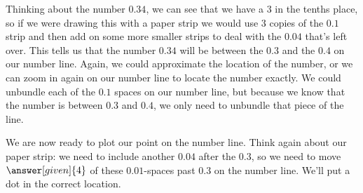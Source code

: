 \documentclass{ximera}
\begin{document}
\begin{example}
Thinking about the number $0.34$, we can see that we have a $3$ in the tenths place, so if we were drawing this with a paper strip we would use $3$ copies of the $0.1$ strip and then add on some more smaller strips to deal with the $0.04$ that's left over. This tells us that the number $0.34$ will be between the $0.3$ and the $0.4$ on our number line. Again, we could approximate the location of the number, or we can zoom in again on our number line to locate the number exactly. We could unbundle each of the $0.1$ spaces on our number line, but because we know that the number is between $0.3$ and $0.4$, we only need to unbundle that piece of the line.

\begin{image}
\end{image}

We are now ready to plot our point on the number line. Think again about our paper strip: we need to include another $0.04$ after the $0.3$, so we need to move $\answer[given]{4}$ of these $0.01$-spaces past $0.3$ on the number line. We'll put a dot in the correct location.

\begin{image}
\end{image}
\end{example}
\end{document}
